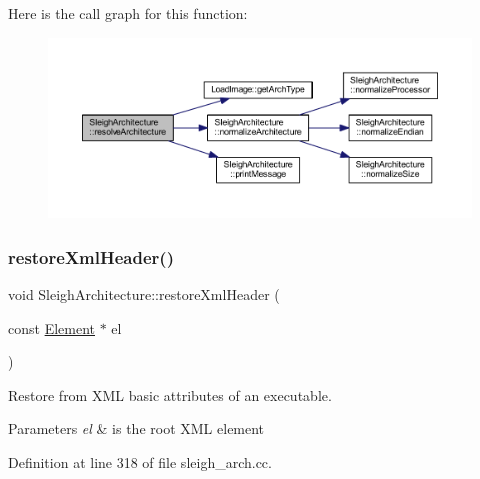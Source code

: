 Here is the call graph for this function\+:
\nopagebreak
\begin{figure}[H]
\begin{center}
\leavevmode
\includegraphics[width=350pt]{class_sleigh_architecture_a937a743a8538c2cbfdb40926cd7bc7f8_cgraph}
\end{center}
\end{figure}
\mbox{\label{class_sleigh_architecture_a9edbac231d5ec6639f02e5888db24943}} 
\subsubsection{\texorpdfstring{restoreXmlHeader()}{restoreXmlHeader()}}
{\footnotesize\ttfamily void Sleigh\+Architecture\+::restore\+Xml\+Header (\begin{DoxyParamCaption}\item[{const \mbox{\hyperlink{class_element}{Element}} $\ast$}]{el }\end{DoxyParamCaption})}



Restore from X\+ML basic attributes of an executable. 


\begin{DoxyParams}{Parameters}
{\em el} & is the root X\+ML element \\
\hline
\end{DoxyParams}


Definition at line 318 of file sleigh\+\_\+arch.\+cc.

